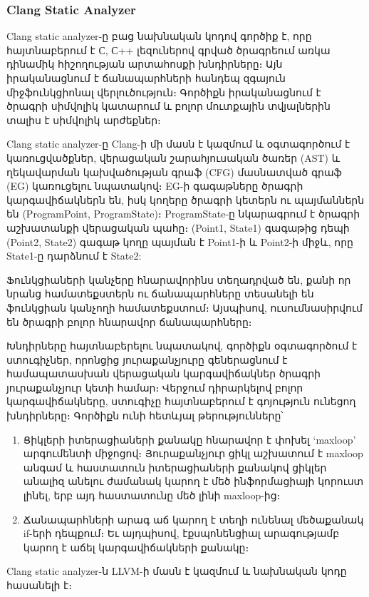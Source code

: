\subsubsection{Clang Static Analyzer}
Clang static analyzer\cite{ClangAnalyzer}-ը բաց նախնական կոդով գործիք է, որը հայտնաբերում է С, С++ լեզուներով գրված
ծրագրեում առկա դինամիկ հիշողության արտահոսքի խնդիրները։ Այն իրականացնում է ճանապարհների հանդեպ զգայուն միջֆունկցիոնալ
վերլուծություն։ Գործիքն իրականացնում է ծրագրի սիմվոլիկ կատարում և բոլոր մուտքային տվյալներին տալիս է սիմվոլիկ արժեքներ։

Clang static analyzer-ը Clang\cite{Clang}-ի մի մասն է կազմում և օգտագործում է կառուցվածքներ, վերացական շարահյուսական
ծառեր (AST) և ղեկավարման կախվածության գրաֆ (CFG) մասնատված գրաֆ (EG) կառուցելու նպատակով։ EG-ի գագաթները ծրագրի
կարգավիճակներն են, իսկ կողերը ծրագրի կետերն ու պայմաններն են (ProgramPoint, ProgramState)։ ProgramState-ը նկարագրում է
ծրագրի աշխատանքի վերացական պահը։ (Point1, State1) գագաթից դեպի (Point2, State2) գագաթ կողը պայման է Point1-ի և Point2-ի
միջև, որը State1-ը դարձնում է State2:

Ֆունկցիաների կանչերը հնարավորինս տեղադրված են, քանի որ նրանց համատեքստերն ու ճանապարհները տեսանելի են ֆունկցիան կանչողի
համատեքստում։ Այսպիսով, ուսումնասիրվում են ծրագրի բոլոր հնարավոր ճանապարհները։

Խնդիրները հայտնաբերելու նպատակով, գործիքն օգտագործում է ստուգիչներ, որոնցից յուրաքանչյուրը գեներացնում է համապատասխան
վերացական կարգավիճակներ ծրագրի յուրաքանչյուր կետի համար։ Վերջում դիրարկելով բոլոր կարգավիճակները, ստուգիչը հայտնաբերում
է գոյություն ունեցող խնդիրները։ Գործիքն ունի հետևյալ թերությունները՝
\begin{enumerate}
    \item Ցիկլերի իտերացիաների քանակը հնարավոր է փոխել ‘maxloop’ արգումենտի միջոցով։ Յուրաքանչյուր ցիկլ աշխատում է
    maxloop անգամ և հաստատուն իտերացիաների քանակով ցիկլեր անալիզ անելու ժամանակ կարող է մեծ ինֆորմացիայի կորուստ լինել,
    երբ այդ հաստատունը մեծ լինի maxloop-ից։
    \item Ճանապարհների արագ աճ կարող է տեղի ունենալ մեծաքանակ if-երի դեպքում։ Եւ այդպիսով, էքսպոնենցիալ արագությամբ
    կարող է աճել կարգավիճակների քանակը։
\end{enumerate}

Clang static analyzer-ն LLVM-ի մասն է կազմում և նախնական կոդը հասանելի է\cite{LLVM}։
